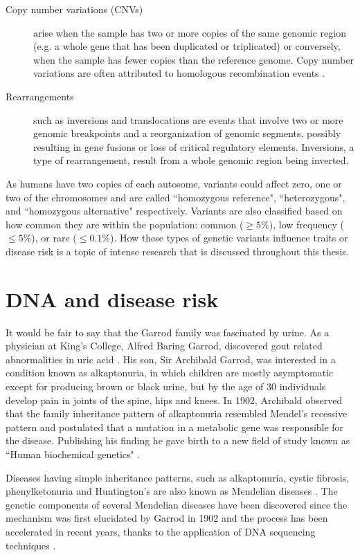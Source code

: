 \begin{description}
	\item[Copy number variations (CNVs)] arise when the sample has two or more copies of the same genomic region (e.g. a whole gene that has been duplicated or triplicated) or conversely, when the sample has fewer copies than the reference genome. Copy number variations are often attributed to homologous recombination events \cite{alberts1995molecular}.

	\item[Rearrangements] such as inversions and translocations are events that involve two or more genomic breakpoints and a reorganization of genomic segments, possibly resulting in gene fusions or loss of critical regulatory elements. Inversions, a type of rearrangement, result from a whole genomic region being inverted.

\end{description}

\noindent As humans have two copies of each autosome, variants could affect zero, one or two of the chromosomes and are called ``homozygous reference", ``heterozygous", and ``homozygous alternative" respectively. 
Variants are also classified based on how common they are within the population: common ($\ge 5\%$), low frequency ($\le 5\%$), or rare ($\le 0.1\%$). 
How these types of genetic variants influence traits or disease risk is a topic of intense research that is discussed throughout this thesis.

\section{DNA and disease risk}

It would be fair to say that the Garrod family was fascinated by urine. 
As a physician at King's College, Alfred Baring Garrod, discovered gout related abnormalities in uric acid \cite{kennedy2001}. 
His son, Sir Archibald Garrod, was interested in a condition known as alkaptonuria, in which children are mostly asymptomatic except for producing brown or black urine, but by the age of 30 individuals develop pain in joints of the spine, hips and knees. 
In 1902, Archibald observed that the family inheritance pattern of alkaptonuria resembled Mendel's recessive pattern and postulated that a mutation in a metabolic gene was responsible for the disease. 
Publishing his finding he gave birth to a new field of study known as ``Human biochemical genetics" \cite{kennedy2001}.

Diseases having simple inheritance patterns, such as alkaptonuria, cystic fibrosis, phenylketonuria and Huntington's are also known as Mendelian diseases \cite{kennedy2001}. 
The genetic components of several Mendelian diseases have been discovered since the mechanism was first elucidated by Garrod in 1902 and the process has been accelerated in recent years, thanks to the application of DNA sequencing techniques \cite{bamshad2011exome}.

